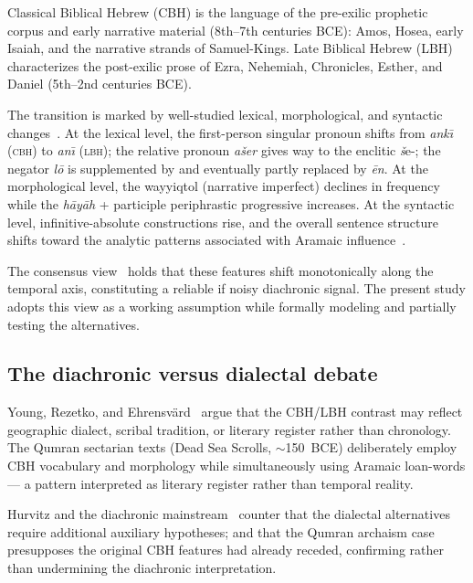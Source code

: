 \documentclass[10pt,letterpaper]{article}
\newcommand{\cbh}{CBH}
\newcommand{\lbh}{LBH}
\begin{document}
Classical Biblical Hebrew (\cbh{}) is the language of the pre-exilic
prophetic corpus and early narrative material (8th--7th centuries BCE):
Amos, Hosea, early Isaiah, and the narrative strands of Samuel-Kings.
Late Biblical Hebrew (\lbh{}) characterizes the post-exilic prose of
Ezra, Nehemiah, Chronicles, Esther, and Daniel (5th--2nd centuries BCE).

The transition is marked by well-studied lexical, morphological, and
syntactic changes~\cite{Hurvitz1997,Rooker1990,Polzin1976,Young2003,Hornkohl2013}.  At the
lexical level, the first-person singular pronoun shifts from \textit{ank\={\i}}
(\textsc{cbh}) to \textit{an\={\i}} (\textsc{lbh}); the relative
pronoun \textit{ašer} gives way to the enclitic \textit{š}e-; the negator
\textit{l\={o}\textquotesingle} is supplemented by and eventually partly
replaced by \textit{\textquotesingle \={e}n}.  At the morphological level,
the wayyiqtol (narrative imperfect) declines in frequency while the
\textit{h\={a}y\={a}h} + participle periphrastic progressive increases.
At the syntactic level, infinitive-absolute constructions rise, and the
overall sentence structure shifts toward the analytic patterns associated
with Aramaic influence~\cite{Young2008,Rezetko2014}.

The consensus view~\cite{Hurvitz1982,Hurvitz2014,Robertson1972,Schniedewind2004} holds that
these features shift monotonically along the temporal axis, constituting a
reliable if noisy diachronic signal.  The present study adopts this view as
a working assumption while formally modeling and partially testing the
alternatives.

\subsection*{The diachronic versus dialectal debate}

Young, Rezetko, and Ehrensv\"{a}rd~\cite{Young2008} argue that the CBH/LBH
contrast may reflect geographic dialect, scribal tradition, or literary
register rather than chronology.  The Qumran sectarian texts (Dead Sea
Scrolls, $\sim$150~BCE) deliberately employ \cbh{} vocabulary and
morphology while simultaneously using Aramaic loan-words --- a pattern
interpreted as literary register rather than temporal reality.

Hurvitz and the diachronic mainstream~\cite{Hurvitz1997} counter that the
dialectal alternatives require additional auxiliary hypotheses; and that
the Qumran archaism case presupposes the original \cbh{} features had
already receded, confirming rather than undermining the diachronic
interpretation.
\end{document}
